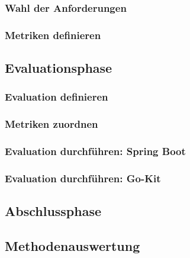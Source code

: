 \subsubsection{Wahl der Anforderungen}
\subsubsection{Metriken definieren}
\subsection{Evaluationsphase}
\subsubsection{Evaluation definieren}
\subsubsection{Metriken zuordnen}
\subsubsection{Evaluation durchführen: Spring Boot}
\subsubsection{Evaluation durchführen: Go-Kit}
\subsection{Abschlussphase}
\subsection{Methodenauswertung}

